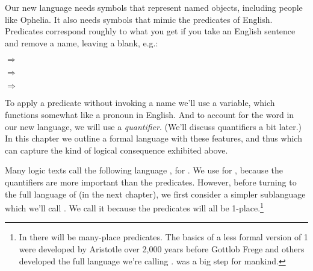 Our new language needs symbols that represent named objects, including people like Ophelia.  It also needs symbols that mimic the predicates of English.  Predicates correspond roughly to what you get if you take an English sentence and remove a name, leaving a blank, e.g.: 

\begin{menumerate}
	\item {} $\Rightarrow$ 
	\item {} $\Rightarrow$ 
	\item {} $\Rightarrow$ 	
\end{menumerate}

\noindent{}To apply a predicate without invoking a name we'll use a variable, which functions somewhat like a pronoun in English.  And to account for the word  in our new language, we will use a \emph{quantifier}.  (We'll discuss quantifiers a bit later.)  In this chapter we outline a formal language with these features, and thus which can capture the kind of logical consequence exhibited above.

Many logic texts call the following language \PL{}, for . 
We use \mention{\QL{}} for , because the quantifiers are more important than the predicates. However, before turning to the full language of \GQL{} (in the next chapter), we first consider a simpler sublanguage which we'll call .  We call it  because the predicates will all be 1-place.\footnote{In \GQL{} there will be many-place predicates.  The basics of a less formal version of \GQL{}1 were developed by Aristotle over 2,000 years before Gottlob Frege and others developed the full language we're calling \GQL{}.  \GQL{} was a big step for mankind.}
 
